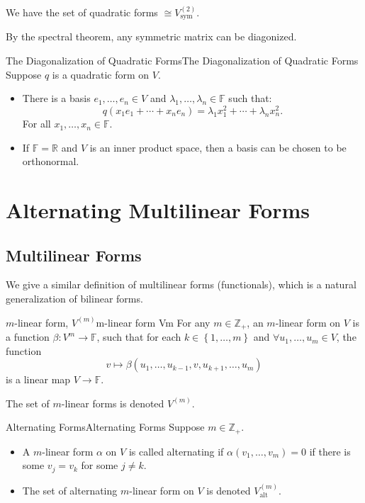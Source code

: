 \documentclass[../main.tex]{subfiles}
\begin{document}
\begin{remark}
We have the set of quadratic forms $\cong V_{\text{sym}}^{(2)}$.
\end{remark}

By the spectral theorem, any symmetric matrix can be diagonized.
\begin{theorem}{The Diagonalization of Quadratic Forms}{The Diagonalization of Quadratic Forms}
Suppose $q$ is a quadratic form on $V$.
\begin{itemize}
\item There is a basis $e_1, \ldots ,e_n\in V$ and $\lambda_1, \ldots ,\lambda_n\in \mathbb{F}$ such that:
	\begin{equation*}
	q(x_1e_1+\cdots +x_ne_n) = \lambda_1 x_1^2+\cdots +\lambda_nx_n^2.
	\end{equation*}
	For all $x_1, \ldots ,x_n\in \mathbb{F}$.
\item If $\mathbb{F}=\mathbb{R}$ and $V$ is an inner product space, then a basis can be chosen to be orthonormal.
\end{itemize}
\end{theorem}


\section{Alternating Multilinear Forms}
\subsection{Multilinear Forms}
We give a similar definition of multilinear forms (functionals), which is a natural generalization of bilinear forms.

\begin{definition}{$m$-linear form, $V^{(m)}$}{m-linear form Vm}
For any $m\in \mathbb{Z}_+$, an $m$-linear form on $V$ is a function $\beta: V^m \rightarrow \mathbb{F}$, such that for each $k\in \left\{ 1, \ldots ,m \right\}$ and $\forall u_1, \ldots ,u_m\in V$, the function
\begin{equation*}
v \mapsto \beta(u_1, \ldots ,u_{k-1}, v,u_{k+1}, \ldots ,u_m)
\end{equation*}
is a linear map $V \rightarrow \mathbb{F}$.

The set of $m$-linear forms is denoted $V^{(m)}$.
\end{definition}

\begin{definition}{Alternating Forms}{Alternating Forms}
Suppose $m\in \mathbb{Z}_+$.
\begin{itemize}
\item A $m$-linear form $\alpha$ on $V$ is called alternating if $\alpha(v_1, \ldots ,v_m)=0$ if there is some $v_j=v_k$ for some $j\neq k$.
\item The set of alternating $m$-linear form on $V$ is denoted $V_{\text{alt}}^{(m)}$.
\end{itemize}
\end{definition}
\end{document}
